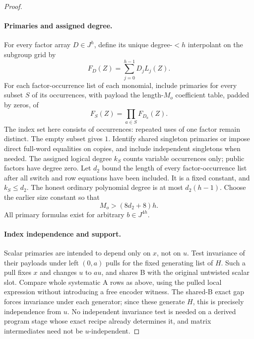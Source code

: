 \begin{proof}
\paragraph{Primaries and assigned degree.}
For every factor array $D\in J^h$, define its unique degree-$<h$
interpolant on the subgroup grid by
\begin{equation}\label{op:factor-interpolant}
                  F_D(Z)=\sum_{j=0}^{h-1}D_jL_j(Z).
\end{equation}
For each factor-occurrence list of each monomial, include primaries
for every subset $S$ of its occurrences, with payload the
length-$M_o$ coefficient table, padded by zeros, of
\begin{equation}\label{op:subset-primary}
                         F_S(Z)=\prod_{a\in S}F_{D_a}(Z).
\end{equation}
The index set here consists of occurrences: repeated uses of one
factor remain distinct.  The empty subset gives $1$.
Identify shared singleton primaries or impose direct full-word
equalities on copies, and include independent singletons when needed.
The assigned logical degree $k_S$ counts variable occurrences only;
public factors have degree zero.  Let $d_2$ bound the length of every
factor-occurrence list after all switch and row equations have been
included.  It is a fixed constant, and $k_S\le d_2$.
The honest ordinary polynomial degree is at most $d_2(h-1)$.
Choose the earlier size constant so that
\begin{equation}\label{op:degree-slack}
                         M_o>(8d_2+8)h.
\end{equation}
All primary formulas exist for arbitrary $b\in J^{4h}$.

\paragraph{Index independence and support.}
Scalar primaries are intended to depend only on $x$, not on $u$.
Test invariance of their payloads under left $(0,a)$ pulls for the
fixed generating list of $H$.  Such a pull fixes $x$ and changes
$u$ to $au$, and shares B with the original untwisted scalar slot.
Compare whole systematic A rows as above, using the pulled local
expression without introducing a free encoder witness.
The shared-B exact gap forces invariance under each generator;
since these generate $H$, this is precisely independence from $u$.
No independent invariance test is needed on a derived program stage
whose exact recipe already determines it, and matrix intermediates
need not be $u$-independent.


\end{proof}
